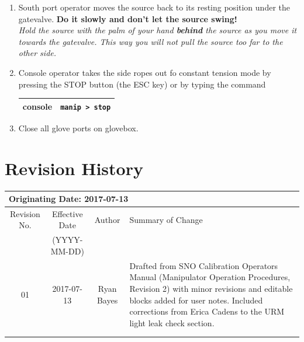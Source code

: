 \documentclass[11pt]{article}
\begin{document}
\begin{enumerate}
\item \CheckBox[name=dsr16]{} South port operator moves the source back to its resting position under the gatevalve. {\bf Do it slowly and don't let the source swing!}\\ {\it Hold the source with the palm of your hand {\bf behind} the source as you move it towards the gatevalve. This way you will not pull the source too far to the other side.}
\item \CheckBox[name=dsr17]{} Console operator takes the side ropes out fo constant tension mode by pressing the STOP button (the ESC key) or by typing the command
\begin{center}
\begin{tabular}{|c|c|}
\hline
console & \verb+manip > stop+\\
\hline
\end{tabular}
\end{center}
\item \CheckBox[name=dsr18]{} Close all glove ports on glovebox.
\end{enumerate}

\section{Revision History}
\begin{tabular}{|c|c|c|p{6cm}|}
\hline\hline
\multicolumn{4}{|l|}{Originating Date: 2017-07-13}\\
\hline
Revision No. & Effective Date & Author & Summary of Change \\
& (YYYY-MM-DD) & & \\
\hline
01 & 2017-07-13 & Ryan Bayes & Drafted from SNO Calibration Operators Manual (Manipulator Operation Procedures, Revision 2) with minor revisions and editable blocks added for user notes. Included corrections from Erica Cadens to the URM light leak check section. \\
\hline
& & & \\
\hline
& & & \\
\hline \hline

\end{tabular}
\end{document}
